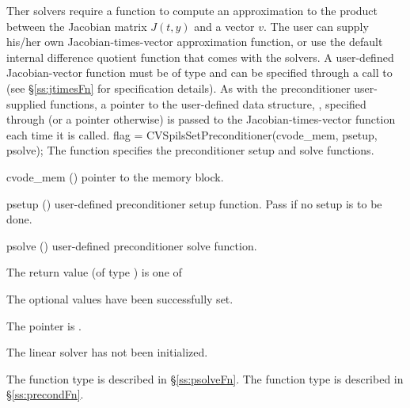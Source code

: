 Ther {\cvspils} solvers require a function to compute an approximation to the
product between the Jacobian matrix $J(t,y)$ and a vector $v$.
The user can supply his/her own Jacobian-times-vector approximation function, 
or use the default internal difference quotient function
that comes with the {\cvspils} solvers.  A user-defined Jacobian-vector
function must be of type  and 
can be specified through a call to  
(see \S\ref{ss:jtimesFn} for specification details).
As with the preconditioner user-supplied functions,
a pointer to the user-defined data structure, , specified through
 (or a  pointer otherwise) is passed to the 
Jacobian-times-vector function  each time it is called.  
{
  flag = CVSpilsSetPreconditioner(cvode\_mem, psetup, psolve);
}
{
  The function  specifies the preconditioner
  setup and solve functions.
}
{
  \begin{args}
  \item[cvode\_mem] ()
    pointer to the {\cvode} memory block.
  \item[psetup] ()
    user-defined preconditioner setup function.
    Pass  if no setup is to be done.
  \item[psolve] ()
    user-defined preconditioner solve function.
  \end{args}
}
{
  The return value  (of type ) is one of
  \begin{args}
  \item[\Id{CVSPILS\_SUCCESS}] 
    The optional values have been successfully set.
  \item[\Id{CVSPILS\_MEM\_NULL}]
    The  pointer is .
  \item[\Id{CVSPILS\_LMEM\_NULL}]
    The {\cvspils} linear solver has not been initialized.
  \end{args}
}
{
   The function type  is described in \S\ref{ss:psolveFn}.
   The function type  is described in \S\ref{ss:precondFn}.
}
